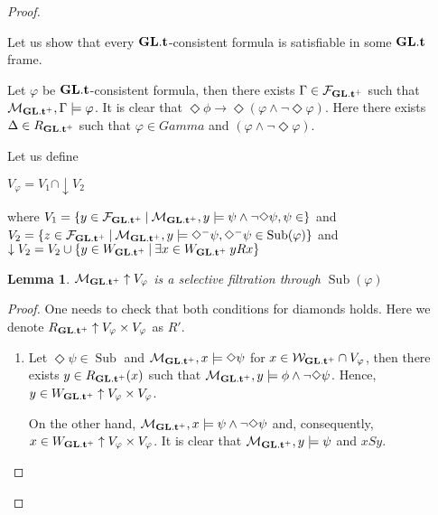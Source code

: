 \documentclass[a4paper]{article}
\theoremstyle{defin}
\theoremstyle{theorem}
\theoremstyle{prop}
\theoremstyle{lemma}
\newtheorem{lemma}{Lemma}
\theoremstyle{ex}
\theoremstyle{col}
\newcommand{\DiamondM}{\Diamond^{-}}
\begin{document}
\begin{proof}
  $ $

  Let us show that every ${\bf GL}.{\bf t}$-consistent formula is satisfiable in some ${\bf GL}.{\bf t}$ frame.

  Let $\varphi$ be ${\bf GL}.{\bf t}$-consistent formula, then there exists $\Gamma \in \mathcal{F}_{{\bf GL}.{\bf t}^{+}}$ such that $\mathcal{M}_{{\bf GL}.{\bf t}^{+}}, \Gamma \models \varphi$. It is clear that $\Diamond \phi \to \Diamond (\varphi \land \neg \Diamond \varphi)$.
  Here there exists $\Delta \in R_{{{\bf GL}.{\bf t}}^{+}}$ such that $\varphi \in Gamma$ and $(\varphi \land \neg \Diamond \varphi)$.

  Let us define

\begin{center}
  $V_{\varphi} = V_1 \cap \downarrow V_2$
\end{center}
where $V_1 = \{ y \in \mathcal{F}_{{\bf GL}.{\bf t}^{+}} \: | \: \mathcal{M}_{{\bf GL}.{\bf t}^{+}}, y \models \psi \land \neg \Diamond \psi, \psi \in \}$ and
$V_2 = \{ z \in \mathcal{F}_{{\bf GL}.{\bf t}^{+}} \: | \: \mathcal{M}_{{\bf GL}.{\bf t}^{+}}, y \models \DiamondM \psi, \DiamondM \psi \in
\operatorname{Sub}(\varphi) \}$ and $\downarrow V_2 = V_2 \cup \{ y \in W_{{\bf GL}.{\bf t}^{+}} \: | \: \exists x \in W_{{\bf GL}.{\bf t}^{+}} \: y R x \}$

\begin{lemma}
  $\mathcal{M}_{{{\bf GL}.{\bf t}^{+}}} \uparrow V_{\varphi}$ is a selective filtration through $\operatorname{Sub}(\varphi)$
\end{lemma}

\begin{proof}
  One needs to check that both conditions for diamonds holds. Here we denote $R_{{{\bf GL}.{\bf t}^{+}}} \uparrow V_{\varphi} \times V_{\varphi}$ as $R'$.

\begin{enumerate}
  \item Let $\Diamond \psi \in \operatorname{Sub}$ and $\mathcal{M}_{{\bf GL}.{\bf t}^{+}}, x \models \Diamond \psi$ for $x \in \mathcal{W}_{{{\bf GL}.{\bf t}^{+}}} \cap V_{\varphi}$, then there exists $y \in R_{{{\bf GL}.{\bf t}^{+}}}(x)$ such that $\mathcal{M}_{{\bf GL}.{\bf t}^{+}}, y \models \phi \land \neg \Diamond \psi$. Hence, $y \in W_{{{\bf GL}.{\bf t}^{+}}} \uparrow V_{\varphi} \times V_{\varphi}$.

  On the other hand, $\mathcal{M}_{{\bf GL}.{\bf t}^{+}}, x \models \psi \land \neg \Diamond \psi$ and, consequently, $x \in W_{{{\bf GL}.{\bf t}^{+}}} \uparrow V_{\varphi} \times V_{\varphi}$. It is clear that $\mathcal{M}_{{\bf GL}.{\bf t}^{+}}, y \models \psi$ and $x S y$.


\end{enumerate}
\end{proof}
\end{proof}
\end{document}
